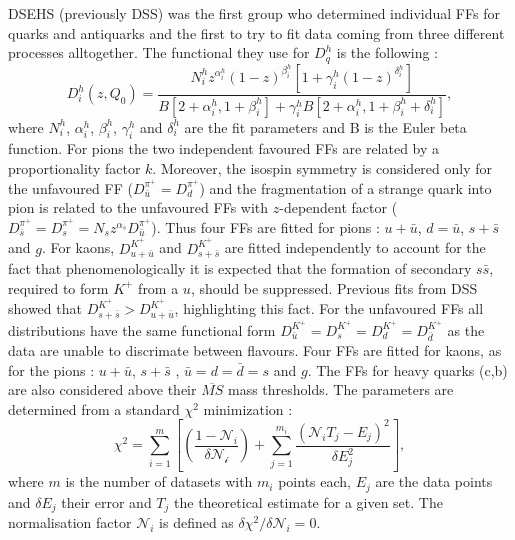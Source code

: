 DSEHS (previously DSS) was the first group who determined individual FFs for quarks and antiquarks and the first to try to fit data coming from three different processes alltogether.
The functional they use for $D^h_q$ is the following :
%
\begin{equation}
  D^h_i (z,Q_0) = \frac{N^h_i z^{\alpha^h_i}(1-z)^{\beta^h_i}\left[ 1+\gamma^h_i(1-z)^{\delta^h_i}\right]}{B\left[2+\alpha^h_i,1+\beta^h_i\right]+\gamma^h_i B\left[2+\alpha^h_i,1+\beta^h_i+\delta^h_i\right]},
  \label{eq:DSEHSparam}
\end{equation}
%
where $N^h_i$, $\alpha^h_i$, $\beta^h_i$, $\gamma^h_i$ and $\delta^h_i$  are the fit parameters and B is the Euler beta function. For pions the two independent favoured FFs are related by a proportionality factor $k$. Moreover, the isospin symmetry is considered only for the unfavoured FF ($D^{\pi^{+}}_{\bar{u}} = D^{\pi^{+}}_{d}$) and the fragmentation of a strange quark into pion is related to the unfavoured FFs with $z$-dependent factor ($D^{\pi^{+}}_{\bar{s}} = D^{\pi^{+}}_{s}=N_s z^{\alpha_s} D^{\pi^{+}}_{\bar{u}}$). Thus four FFs are fitted for pions : $u+\bar{u}$, $d=\bar{u}$, $s+\bar{s}$ and $g$. For kaons, $D^{K^+}_{u+\bar{u}}$ and $D^{K^+}_{s+\bar{s}}$ are fitted independently to account for the fact that phenomenologically it is expected that the formation of secondary $s\bar{s}$, required to form $K^+$ from a $u$, should be suppressed. Previous fits from DSS showed that $D^{K^+}_{s+\bar{s}} > D^{K^+}_{u+\bar{u}}$, highlighting this fact. For the unfavoured FFs all distributions have the same functional form  $D^{K^+}_{\bar{u}} = D^{K^+}_{s} = D^{K^+}_{d} = D^{K^+}_{\bar{d}}$ as the data are unable to discrimate between flavours. Four FFs are fitted for kaons, as for the pions :  $u+\bar{u}$, $s+\bar{s}$ , $\bar{u}=d=\bar{d}=s$ and $g$.
The FFs for heavy quarks (c,b) are also considered above their $\overline{MS}$ mass thresholds.
The parameters are determined from a standard $\chi^2$ minimization :
%
\begin{equation}
  \chi^2 =  \sum_{i=1}^{m} \left[ \left( \frac{1-\mathscr{N}_i}{\delta\mathscr{N_i}} \right) + \sum_{j=1}^{m_i} \frac{(\mathscr{N}_i T_j - E_j)^2}{\delta E^2_j} \right],
  \label{eq:DSEHSmin}
\end{equation}
%
where $m$ is the number of datasets with $m_i$ points each, $E_j$ are the data points and $\delta E_j$ their error and $T_j$ the theoretical estimate for a given set. The normalisation factor $\mathscr{N}_i$ is defined as $\delta \chi^2 / \delta\mathscr{N}_i = 0$.

